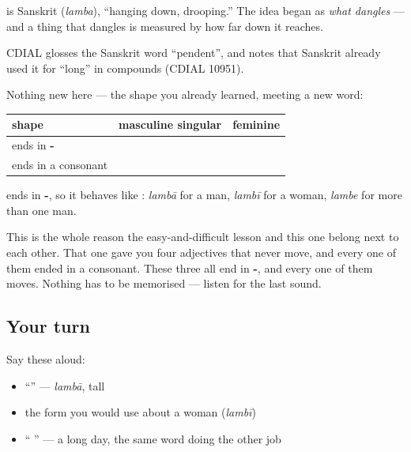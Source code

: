\begin{cousinweb}
\textbf{} is Sanskrit \textbf{} (\emph{lamba}), \textquotedblleft{}hanging down, drooping.\textquotedblright{} The idea began as \emph{what dangles} — and a thing that dangles is measured by how far down it reaches.

CDIAL glosses the Sanskrit word \textquotedblleft{}pendent\textquotedblright{}, and notes that Sanskrit already used it for \textquotedblleft{}long\textquotedblright{} in compounds (CDIAL 10951).
\end{cousinweb}

\begin{grammarlens}[title={Grammar Lens: this one ends in -\hi{आ}, so it bends}]
Nothing new here — the shape you already learned, meeting a new word:

\noindent
\begin{tabularx}{\linewidth}{@{}>{\raggedright\arraybackslash}X>{\raggedright\arraybackslash}X>{\raggedright\arraybackslash}X@{}}
\toprule
\textbf{shape} & \textbf{masculine singular} & \textbf{feminine} \\
\midrule
ends in \textbf{-\hi{आ}} & \hi{लंबा} & \hi{लंबी} \\
ends in a consonant & \hi{आसान} & \hi{आसान} \\
\bottomrule
\end{tabularx}

\textbf{} ends in \textbf{-}, so it behaves like \textbf{}: \emph{lambā} for a man, \emph{lambī} for a woman, \emph{lambe} for more than one man.

This is the whole reason the easy-and-difficult lesson and this one belong next to each other. That one gave you four adjectives that never move, and every one of them ended in a consonant. These three all end in \textbf{-}, and every one of them moves. Nothing has to be memorised — listen for the last sound.
\end{grammarlens}

\subsection*{Your turn}
Say these aloud:

\begin{itemize}
\raggedright
  \item \textquotedblleft{}\textquotedblright{} — \emph{lambā}, tall
  \item the form you would use about a woman (\emph{lambī})
  \item \textquotedblleft{} \textquotedblright{} — a long day, the same word doing the other job
\end{itemize}


